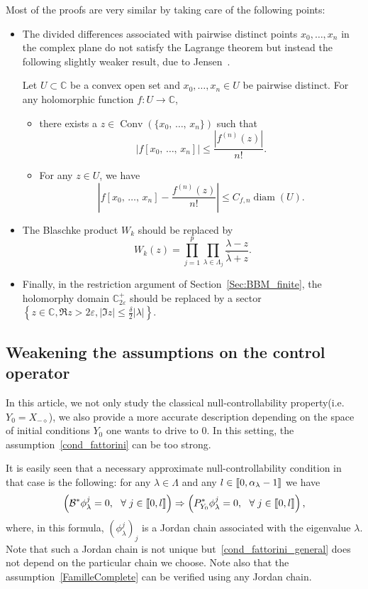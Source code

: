 \documentclass[10pt]{amsart}
\theoremstyle{definition}\newtheorem{defi}[theo]{Definition}\newtheorem{rema}[theo]{Remark}\newtheorem{exam}[theo]{Example}\newtheorem{exem}[theo]{Example}\newtheorem{nota}[theo]{Notation}
\DeclareMathOperator{\Conv}{Conv}
\newcommand{\llbracket}{\mathopen{[\mkern -2.7mu[}}
\newcommand{\rrbracket}{\mathclose{]\mkern -2.7mu]}}
\newcommand{\inter}[2]{\llbracket #1,#2 \rrbracket}
\newcommand\Bs{\mathcal{B}^*}
\newcommand{\Xmalpha}{X_{-\diamond}}
\newcommand{\Fzp}{Y_0}
\newcommand{\PFa}{P_{\Fzp}^*}
\newcommand{\C}{\mathbb{C}}
\newcommand{\Cpeps}{\mathbb{C}^+_{2\varepsilon}}
\DeclareMathOperator{\diam}{diam}
\let\oldforall\forall
\renewcommand*{\forall}{\mathrel{\oldforall}}
\begin{document}
Most of the proofs are very similar by taking care of the following points:
\begin{itemize}
\item The divided differences associated with pairwise distinct points $x_0,\dotsc,x_n$ in the complex plane do not satisfy the Lagrange theorem but instead the following slightly weaker result, due to Jensen~\cite{Jensen_1894}.
\begin{prop}
Let $U\subset \C$ be a convex open set and $x_0,\dotsc,x_n\in U$ be pairwise distinct. For any holomorphic function $f:U\to \C$,
\begin{itemize}
\item there exists a $z\in \Conv(\{x_0,\,\dotsc,\,x_n\})$ such that
\[
|f[x_0,\,\dotsc,\,x_n]| \leq \frac{\left|f^{(n)}(z)\right|}{n!}.
\]
\item For any $z\in U$, we have
\[
\left|f[x_0,\,\dotsc,\,x_n] - \frac{f^{(n)}(z)}{n!}\right| \leq C_{f,n} \diam(U).
\]
\end{itemize}
\end{prop}
\item The Blaschke product $W_k$ should be replaced by
\[
W_k(z)=\prod_{j=1}^p \prod_{\lambda\in \Lambda_j} \frac{\lambda - z}{\bar{\lambda} + z}.
\]
\item Finally, in the restriction argument of Section~\ref{Sec:BBM_finite}, the holomorphy domain $\Cpeps$ should be replaced by a sector $\left\{z\in \C, \Re z>2\varepsilon, |\Im z|\leq \frac{\delta}{2} |\lambda|\right\}$.
\end{itemize}


\subsection{Weakening the assumptions on the control operator} \label{Sec:Gestion_de_B*}

In this article, we not only study the classical null-controllability property\linebreak(i.e.$\Fzp=\Xmalpha$), we also provide a more accurate description depending on the space of initial conditions $\Fzp$ one wants to drive to $0$. In this setting, the assumption~\eqref{cond_fattorini} can be too strong.

It is easily seen that a necessary approximate null-controllability condition in that case is the following: for any $\lambda\in \Lambda$ and any $l\in \inter{0}{\alpha_\lambda-1}$ we have
\begin{equation}\label{cond_fattorini_general}
\left(\Bs \phi_\lambda^j=0, \ \ \forall j\in \inter{0}{l}\right) \Rightarrow \left(\PFa \phi_\lambda^j=0, \ \ \forall j\in\inter{0}{l}\right),
\end{equation}
where, in this formula, $(\phi_\lambda^j)_j$ is a Jordan chain associated with the eigenvalue $\lambda$. Note that such a Jordan chain is not unique but~\eqref{cond_fattorini_general} does not depend on the particular chain we choose. Note also that the assumption~\eqref{FamilleComplete} can be verified using any Jordan chain.
\end{document}
